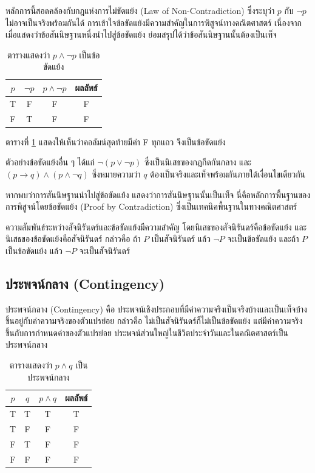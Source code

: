 หลักการนี้สอดคล้องกับกฎแห่งการไม่ขัดแย้ง (Law of Non-Contradiction) ซึ่งระบุว่า $p$ กับ $\neg p$ ไม่อาจเป็นจริงพร้อมกันได้ การเข้าใจข้อขัดแย้งมีความสำคัญในการพิสูจน์ทางคณิตศาสตร์ เนื่องจากเมื่อแสดงว่าข้อสันนิษฐานหนึ่งนำไปสู่ข้อขัดแย้ง ย่อมสรุปได้ว่าข้อสันนิษฐานนั้นต้องเป็นเท็จ

\begin{table}[H]
    \centering
    \caption{ตารางแสดงว่า $p \land \neg p$ เป็นข้อขัดแย้ง}
    \label{tab:contradiction}
    \begin{tabular}{|c|c|c|c|}
        \hline
        \textbf{$p$} & \textbf{$\neg p$} & \textbf{$p \land \neg p$} & \textbf{ผลลัพธ์} \\ \hline
        T & F & F & F \\ \hline
        F & T & F & F \\ \hline
    \end{tabular}
\end{table}

ตารางที่ \ref{tab:contradiction} แสดงให้เห็นว่าคอลัมน์สุดท้ายมีค่า F ทุกแถว จึงเป็นข้อขัดแย้ง

ตัวอย่างข้อขัดแย้งอื่น ๆ ได้แก่ $\neg(p \lor \neg p)$ ซึ่งเป็นนิเสธของกฎกีดกันกลาง และ $(p \rightarrow q) \land (p \land \neg q)$ ซึ่งหมายความว่า $q$ ต้องเป็นจริงและเท็จพร้อมกันภายใต้เงื่อนไขเดียวกัน

หากพบว่าการสันนิษฐานนำไปสู่ข้อขัดแย้ง แสดงว่าการสันนิษฐานนั้นเป็นเท็จ นี่คือหลักการพื้นฐานของการพิสูจน์โดยข้อขัดแย้ง (Proof by Contradiction) ซึ่งเป็นเทคนิคพื้นฐานในทางคณิตศาสตร์

ความสัมพันธ์ระหว่างสัจนิรันดร์และข้อขัดแย้งมีความสำคัญ โดยนิเสธของสัจนิรันดร์คือข้อขัดแย้ง และนิเสธของข้อขัดแย้งคือสัจนิรันดร์ กล่าวคือ ถ้า $P$ เป็นสัจนิรันดร์ แล้ว $\neg P$ จะเป็นข้อขัดแย้ง และถ้า $P$ เป็นข้อขัดแย้ง แล้ว $\neg P$ จะเป็นสัจนิรันดร์

\subsection{ประพจน์กลาง (Contingency)}

ประพจน์กลาง (Contingency) คือ ประพจน์เชิงประกอบที่มีค่าความจริงเป็นจริงบ้างและเป็นเท็จบ้าง ขึ้นอยู่กับค่าความจริงของตัวแปรย่อย กล่าวคือ ไม่เป็นสัจนิรันดร์ก็ไม่เป็นข้อขัดแย้ง แต่มีค่าความจริงขึ้นกับการกำหนดค่าของตัวแปรย่อย ประพจน์ส่วนใหญ่ในชีวิตประจำวันและในคณิตศาสตร์เป็นประพจน์กลาง~\parencite{enderton2001logic}

\begin{table}[H]
    \centering
    \caption{ตารางแสดงว่า $p \land q$ เป็นประพจน์กลาง}
    \label{tab:contingency-example}
    \begin{tabular}{|c|c|c|c|}
        \hline
        \textbf{$p$} & \textbf{$q$} & \textbf{$p \land q$} & \textbf{ผลลัพธ์} \\ \hline
        T & T & T & T \\ \hline
        T & F & F & F \\ \hline
        F & T & F & F \\ \hline
        F & F & F & F \\ \hline
    \end{tabular}
\end{table}

